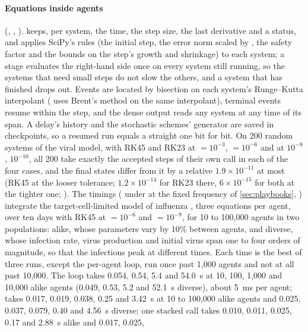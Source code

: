 \paragraph{Equations inside agents} (, ,
).  keeps, per system, the time, the step size, the
last derivative and a status, and applies SciPy's rules (the initial step, the error norm
scaled by , the safety factor and the bounds on the step's growth and
shrinkage) to each system; a stage evaluates the right-hand side once on every system still
running, so the systems that need small steps do not slow the others, and a system that has
finished drops out. Events are located by bisection on each system's Runge--Kutta
interpolant ( uses Brent's method on the same interpolant), terminal events
resume within the step, and the dense output reads any system at any time of its span. A
delay's history and the stochastic schemes' generator are saved in checkpoints, so a resumed
run equals a straight one bit for bit. On 200 random
systems of the viral model, with RK45 and RK23 at  $= 10^{-3}$,  $=
10^{-6}$ and at $10^{-8}$, $10^{-10}$, all 200 take exactly the accepted steps of their own
 call in each of the four cases, and the final states differ from it by a
relative $1.9 \times 10^{-11}$ at most (RK45 at the looser tolerance; $1.2 \times 10^{-14}$ for
RK23 there, $6 \times 10^{-15}$ for both at the tighter one; ).
The timings ( under  at the fixed frequency
of \cref{sec:playbooks}, ) integrate the target-cell-limited
model of influenza \citep{baccam2006kinetics}, three equations per agent, over ten days with
RK45 at  $= 10^{-6}$ and  $= 10^{-9}$, for 10 to 100,000 agents in two
populations: alike, whose parameters vary by 10\% between agents, and diverse, whose infection
rate, virus production and initial virus span one to four orders of magnitude, so that the
infections peak at different times. Each time is the best of three runs, except the per-agent
loop, run once past 1,000 agents and not at all past 10,000. The loop takes 0.054, 0.54, 5.4
and 54.0~s at 10, 100, 1,000 and 10,000 alike agents (0.049, 0.53, 5.2 and 52.1~s diverse),
about 5~ms per agent;  takes 0.017, 0.019, 0.038, 0.25 and 3.42~s at 10 to
100,000 alike agents and 0.025, 0.037, 0.079, 0.40 and 4.56~s diverse; one stacked
 call takes 0.010, 0.011, 0.025, 0.17 and 2.88~s alike and 0.017, 0.025,
